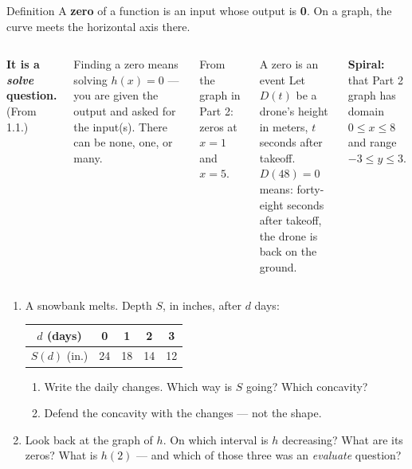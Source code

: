 \documentclass[aspectratio=169, 11pt]{beamer}
\begin{document}
\begin{frame}[t, plain]

  \begin{block}{Definition}
    A \textbf{zero} of a function is an input whose output is \textbf{0}. On a
    graph, the curve meets the horizontal axis there.
  \end{block}

  \bigskip
  \begin{columns}[T]
      \textbf{It is a \textit{solve} question.} (From 1.1.)

      \smallskip
      Finding a zero means solving \(h(x) = 0\) --- you are given the output
      and asked for the input(s). There can be none, one, or many.

      \medskip
      From the graph in Part 2: zeros at \(x = 1\) and \(x = 5\).

      \begin{block}{A zero is an event}
        Let \(D(t)\) be a drone's height in meters, \(t\) seconds after
        takeoff. \\[4pt]
        \(D(48) = 0\) means: forty-eight seconds after takeoff, the drone is
        back on the ground.
      \end{block}

      \medskip
      \textbf{Spiral:} that Part 2 graph has domain \(0 \le x \le 8\) and
      range \(-3 \le y \le 3\).
  \end{columns}
\end{frame}

\begin{frame}[t, plain]

  \begin{enumerate}\setlength{\itemsep}{10pt}
    \item A snowbank melts. Depth \(S\), in inches, after \(d\) days:

          \smallskip
          \begin{tabular}{|c|c|c|c|c|}
          \hline
          \(d\) (days) & 0 & 1 & 2 & 3 \\
          \hline
          \(S(d)\) (in.) & 24 & 18 & 14 & 12 \\
          \hline
          \end{tabular}

          \smallskip
          \begin{enumerate}\setlength{\itemsep}{5pt}
            \item Write the daily changes. Which way is \(S\) going? Which
                  concavity?
            \item Defend the concavity with the changes --- not the shape.
          \end{enumerate}

    \item Look back at the graph of \(h\). On which interval is \(h\)
          decreasing? What are its zeros? What is \(h(2)\) --- and which of
          those three was an \textit{evaluate} question?
  \end{enumerate}
\end{frame}
\end{document}
